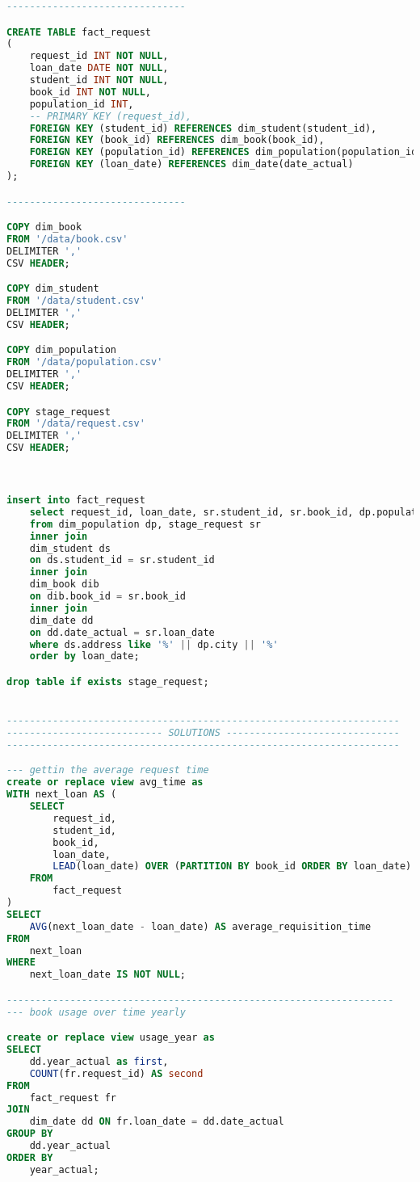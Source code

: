 \begin{lstlisting}[language=SQL, caption={init.sql}, label={lst:init_sql}]
-------------------------------

CREATE TABLE fact_request
(
    request_id INT NOT NULL,
    loan_date DATE NOT NULL,
    student_id INT NOT NULL,
    book_id INT NOT NULL,
    population_id INT,
    -- PRIMARY KEY (request_id),
    FOREIGN KEY (student_id) REFERENCES dim_student(student_id),
    FOREIGN KEY (book_id) REFERENCES dim_book(book_id),
    FOREIGN KEY (population_id) REFERENCES dim_population(population_id),
    FOREIGN KEY (loan_date) REFERENCES dim_date(date_actual)
);

-------------------------------

COPY dim_book
FROM '/data/book.csv'
DELIMITER ','
CSV HEADER;

COPY dim_student
FROM '/data/student.csv'
DELIMITER ','
CSV HEADER;

COPY dim_population
FROM '/data/population.csv'
DELIMITER ','
CSV HEADER;

COPY stage_request
FROM '/data/request.csv'
DELIMITER ','
CSV HEADER;



insert into fact_request 
    select request_id, loan_date, sr.student_id, sr.book_id, dp.population_id
    from dim_population dp, stage_request sr
    inner join 
    dim_student ds
    on ds.student_id = sr.student_id
    inner join
    dim_book dib
    on dib.book_id = sr.book_id
    inner join
    dim_date dd
    on dd.date_actual = sr.loan_date
    where ds.address like '%' || dp.city || '%'
    order by loan_date;

drop table if exists stage_request;


--------------------------------------------------------------------
--------------------------- SOLUTIONS ------------------------------
--------------------------------------------------------------------

--- gettin the average request time
create or replace view avg_time as
WITH next_loan AS (
    SELECT 
        request_id,
        student_id,
        book_id,
        loan_date,
        LEAD(loan_date) OVER (PARTITION BY book_id ORDER BY loan_date) AS next_loan_date
    FROM 
        fact_request
)
SELECT 
    AVG(next_loan_date - loan_date) AS average_requisition_time
FROM 
    next_loan
WHERE 
    next_loan_date IS NOT NULL;

-------------------------------------------------------------------
--- book usage over time yearly

create or replace view usage_year as
SELECT
    dd.year_actual as first,
    COUNT(fr.request_id) AS second
FROM
    fact_request fr
JOIN
    dim_date dd ON fr.loan_date = dd.date_actual
GROUP BY
    dd.year_actual
ORDER BY
    year_actual;


\end{lstlisting}
